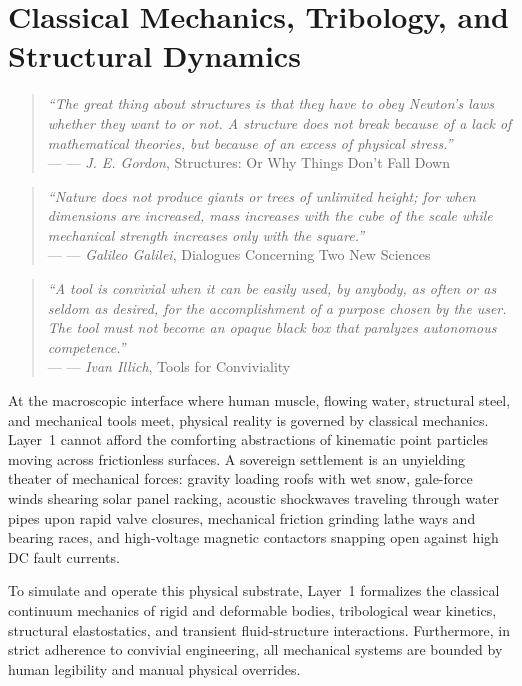\chapter{Classical Mechanics, Tribology, and Structural Dynamics}
\label{chap:layer1_mechanics}

\providecommand{\epigraph}[2]{%
  \begin{quote}
    \textit{#1} \\
    \raggedleft--- #2
  \end{quote}
}

\epigraph{
    ``The great thing about structures is that they have to obey Newton's laws whether they want to or not. A structure does not break because of a lack of mathematical theories, but because of an excess of physical stress.''
}{--- \textit{J. E. Gordon}, \textnormal{Structures: Or Why Things Don't Fall Down} \cite{gordon2003structures}}

\epigraph{
    ``Nature does not produce giants or trees of unlimited height; for when dimensions are increased, mass increases with the cube of the scale while mechanical strength increases only with the square.''
}{--- \textit{Galileo Galilei}, \textnormal{Dialogues Concerning Two New Sciences} \cite{galileo1638dialogues}}

\epigraph{
    ``A tool is convivial when it can be easily used, by anybody, as often or as seldom as desired, for the accomplishment of a purpose chosen by the user. The tool must not become an opaque black box that paralyzes autonomous competence.''
}{--- \textit{Ivan Illich}, \textnormal{Tools for Conviviality} \cite{illich1973conviviality}}

At the macroscopic interface where human muscle, flowing water, structural steel, and mechanical tools meet, physical reality is governed by classical mechanics. Layer~1 cannot afford the comforting abstractions of kinematic point particles moving across frictionless surfaces. A sovereign settlement is an unyielding theater of mechanical forces: gravity loading roofs with wet snow, gale-force winds shearing solar panel racking, acoustic shockwaves traveling through water pipes upon rapid valve closures, mechanical friction grinding lathe ways and bearing races, and high-voltage magnetic contactors snapping open against high DC fault currents.

To simulate and operate this physical substrate, Layer~1 formalizes the classical continuum mechanics of rigid and deformable bodies, tribological wear kinetics, structural elastostatics, and transient fluid-structure interactions. Furthermore, in strict adherence to convivial engineering, all mechanical systems are bounded by human legibility and manual physical overrides.

